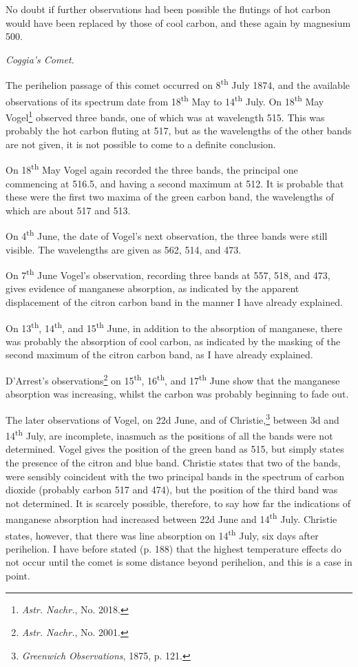 \documentclass[a4paper, 12pt, oneside, polutonikogreek, english]{article}
\begin{document}
No doubt if further observations had been possible the flutings of hot carbon would have been replaced by those of cool carbon, and these again by magnesium 500.

\emph{Coggia's Comet.}

The perihelion passage of this comet occurred on 8\textsuperscript{th} July 1874, and the available observations of its spectrum date from 18\textsuperscript{th} May to 14\textsuperscript{th} July. On 18\textsuperscript{th} May Vogel\footnote{\emph{Astr. Nachr.}, No. 2018.} observed three bands, one of which was at wavelength 515. This was probably the hot carbon fluting at 517, but as the wavelengths of the other bands are not given, it is not possible to come to a definite conclusion.

On 18\textsuperscript{th} May Vogel again recorded the three bands, the principal one commencing at 516.5, and having a second maximum at 512. It is probable that these were the first two maxima of the green carbon band, the wavelengths of which are about 517 and 513.

On 4\textsuperscript{th} June, the date of Vogel's next observation, the three bands were still visible. The wavelengths are given as 562, 514, and 473.

On 7\textsuperscript{th} June Vogel's observation, recording three bands at 557, 518, and 473, gives evidence of manganese absorption, as indicated by the apparent displacement of the citron carbon band in the manner I have already explained.

On 13\textsuperscript{th}, 14\textsuperscript{th}, and 15\textsuperscript{th} June, in addition to the absorption of manganese, there was probably the absorption of cool carbon, as indicated by the masking of the second maximum of the citron carbon band, as I have already explained.

D'Arrest's observations\footnote{\emph{Astr. Nachr.}, No. 2001.} on 15\textsuperscript{th}, 16\textsuperscript{th}, and 17\textsuperscript{th} June show that the manganese absorption was increasing, whilst the carbon was probably beginning to fade out.

The later observations of Vogel, on 22d June, and of Christie,\footnote{\emph{Greenwich Observations}, 1875, p. 121.} between 3d and 14\textsuperscript{th} July, are incomplete, inasmuch as the positions of all the bands were not determined. Vogel gives the position of the green band as 515, but simply states the presence of the citron and blue band. Christie states that two of the bands, were sensibly coincident with the two principal bands in the spectrum of carbon dioxide (probably carbon 517 and 474), but the position of the third band was not determined. It is scarcely possible, therefore, to say how far the indications of manganese absorption had increased between 22d June and 14\textsuperscript{th} July. Christie states, however, that there was line absorption on 14\textsuperscript{th} July, six days after perihelion. I have before stated (p. 188) that the highest temperature effects do not occur until the comet is some distance beyond perihelion, and this is a case in point.
\end{document}
